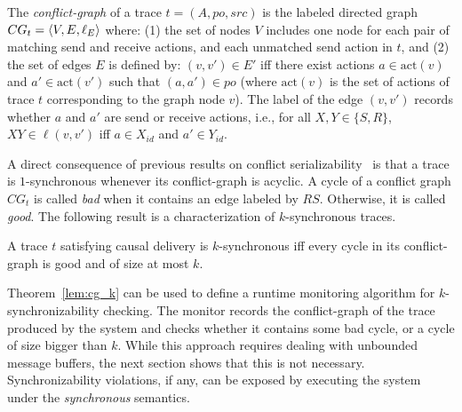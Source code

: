 
    The \emph{conflict-graph} of a trace $t=(A,po,src)$ is the labeled directed graph $CG_t=\left\langle {V,E,\ell_E} \right\rangle$ where:
(1) the set of nodes $V$ includes one node for each pair of matching send and receive actions, and each unmatched send action in $t$, and 
(2) the set of edges $E$ is defined by: $(v,v') \in E'$ iff there exist actions $a \in \mathrm{act}(v)$ and $a' \in \mathrm{act}(v')$ such that $(a,a') \in po$ (where $\mathrm{act}(v)$ is the set of actions of trace $t$ corresponding to the graph node $v$). The label of the edge $(v,v')$ records whether $a$ and $a'$ are send or receive actions, i.e., for all $X,Y\in \{S,R\}$, $XY\in \ell(v,v')$ iff $a\in X_{id}$ and $a'\in Y_{id}$.

A direct consequence of previous results on conflict serializability~\cite{journals/jacm/Papadimitriou79b} is that 
a trace is $1$-synchronous whenever its conflict-graph is acyclic.
%
%
A cycle of a conflict graph $CG_t$ is called \emph{bad} when it contains %
an edge labeled by $RS$.
Otherwise, it is called \emph{good}.
The following result is a characterization of $k$-synchronous traces. %


\begin{theorem}\label{lem:cg_k}
A trace $t$ satisfying causal delivery is $k$-synchronous if{f} every cycle in its conflict-graph is good and of size at most $k$.
\end{theorem}

Theorem~\ref{lem:cg_k} can be used to define a runtime monitoring algorithm for $k$-synchronizability checking. 
The monitor records the conflict-graph of the trace produced by the system and checks whether it contains some bad cycle, or a cycle of size bigger than $k$.
While this approach requires dealing with unbounded message buffers, the next section shows that this is not necessary. Synchronizability violations, if any, can be exposed by executing the system under the \emph{synchronous} semantics.




